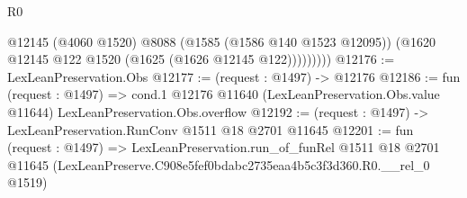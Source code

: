 \begin{lexlean}{R0}
\begin{coremodule}
                @12145
                (@4060 @1520)
                @8088
                (@1585 (@1586 @140 @1523 @12095))
                (@1620 @12145 @122 @1520 (@1625 (@1626 @12145 @122)))))))))
@12176 := LexLeanPreservation.Obs
@12177 := (request : @1497) -> @12176
@12186 := fun (request : @1497) =>
  cond.{1} @12176 @11640 (LexLeanPreservation.Obs.value @11644) LexLeanPreservation.Obs.overflow
@12192 := (request : @1497) -> LexLeanPreservation.RunConv @1511 @18 @2701 @11645
@12201 := fun (request : @1497) =>
  LexLeanPreservation.run_of_funRel
    @1511
    @18
    @2701
    @11645
    (LexLeanPreserve.C908e5fef0bdabc2735eaa4b5c3f3d360.R0.__rel_0 @1519)
\end{coremodule}
\end{lexlean}
